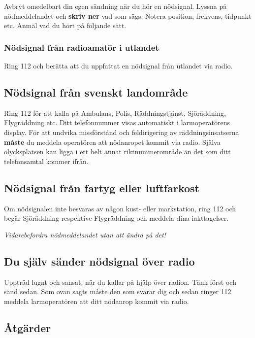 Avbryt omedelbart din egen sändning när du hör en nödsignal. Lyssna på
nödmeddelandet och \textbf{skriv ner} vad som sägs. Notera position, frekvens, tidpunkt
etc. Anmäl vad du hört på följande sätt.

\subsubsection{Nödsignal från radioamatör i utlandet}

Ring 112 och berätta att du uppfattat en nödsignal från utlandet via radio.

\subsection{Nödsignal från svenskt landområde}

Ring 112 för att kalla på Ambulans, Polis, Räddningstjänst, Sjöräddning,
Flygräddning etc.
Ditt telefonnummer visas automatiskt i larmoperatörens display.
För att undvika missförstånd och feldirigering av räddningsinsatserna
\textbf{måste} du meddela operatören att nödanropet kommit via radio.
Själva olycksplatsen kan ligga i ett helt annat riktnummerområde än det som ditt
telefonsamtal kommer ifrån.

\subsection{Nödsignal från fartyg eller luftfarkost}

Om nödsignalen inte besvaras av någon kust- eller markstation, ring 112
och begär Sjöräddning respektive Flygräddning och meddela dina iakttagelser.

\emph{Vidarebefordra nödmeddelandet utan att ändra på det!}

\subsection{Du själv sänder nödsignal över radio}

Uppträd lugnt och sansat, när du kallar på hjälp över radion.
Tänk först och sänd sedan.
Som ovan sagts måste den som svarar dig och sedan ringer 112 meddela
larmoperatören att ditt nödanrop kommit via radio.

\subsection{Åtgärder}

